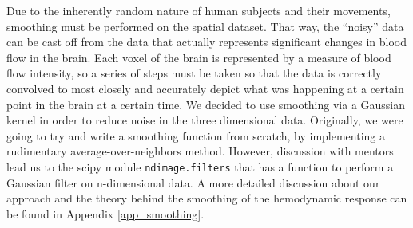 \par \indent Due to the inherently random nature of human subjects and their 
movements, smoothing must be performed on the spatial dataset. That way, the 
``noisy'' data can be cast off from the data that actually represents 
significant changes in blood flow in the brain. Each voxel of the brain is 
represented by a measure of blood flow intensity, so a series of steps must 
be taken so that the data is correctly convolved to most closely and 
accurately depict what was happening at a certain point in the brain at a 
certain time. We decided to use smoothing via a Gaussian kernel in order to 
reduce noise in the three dimensional data. Originally, we were going to try 
and write a smoothing function from scratch, by implementing a rudimentary 
average-over-neighbors method. However, discussion with mentors lead us to the 
scipy module \texttt{ndimage.filters} that has a function to perform a
Gaussian filter on n-dimensional data. A more detailed discussion about our 
approach and the theory behind the smoothing of the hemodynamic response can 
be found in Appendix \ref{app_smoothing}.


